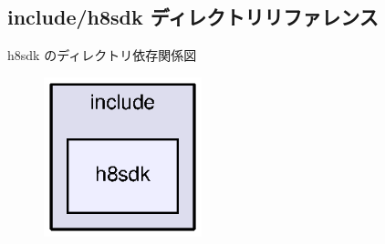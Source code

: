 \subsection{include/h8sdk ディレクトリリファレンス}
\label{dir_cccf68db23ba25fb97e4e5b2069f9a17}
h8sdk のディレクトリ依存関係図
\nopagebreak
\begin{figure}[H]
\begin{center}
\leavevmode
\includegraphics[width=130pt]{dir_cccf68db23ba25fb97e4e5b2069f9a17_dep}
\end{center}
\end{figure}
